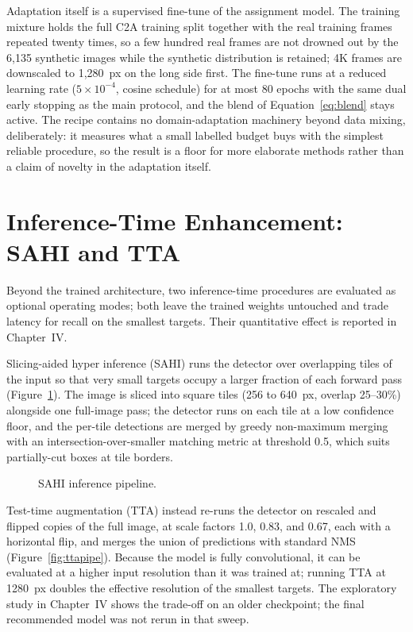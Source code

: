 Adaptation itself is a supervised fine-tune of the assignment model. The
training mixture holds the full C2A training split together with the real
training frames repeated twenty times, so a few hundred real frames are not
drowned out by the 6{,}135 synthetic images while the synthetic distribution
is retained; 4K frames are downscaled to 1{,}280~px on the long side first.
The fine-tune runs at a reduced learning rate ($5\times10^{-4}$, cosine
schedule) for at most 80 epochs with the same dual early stopping as the main
protocol, and the blend of Equation~\eqref{eq:blend} stays active. The recipe
contains no domain-adaptation machinery beyond data mixing, deliberately: it
measures what a small labelled budget buys with the simplest reliable
procedure, so the result is a floor for more elaborate methods rather than a
claim of novelty in the adaptation itself.

\section{Inference-Time Enhancement: SAHI and TTA}
Beyond the trained architecture, two inference-time procedures are evaluated as
optional operating modes; both leave the trained weights untouched and trade
latency for recall on the smallest targets. Their quantitative effect is
reported in Chapter~IV.

Slicing-aided hyper inference (SAHI) runs the detector over overlapping tiles of
the input so that very small targets occupy a larger fraction of each forward
pass (Figure~\ref{fig:sahipipe}). The image is sliced into square tiles (256 to
640~px, overlap 25--30\%) alongside one full-image pass; the detector runs on
each tile at a low confidence floor, and the per-tile detections are merged by
greedy non-maximum merging with an intersection-over-smaller matching metric at
threshold 0.5, which suits partially-cut boxes at tile borders.

\begin{figure}[tbp]
  \centering
  \caption{SAHI inference pipeline.}
  \label{fig:sahipipe}
\end{figure}

Test-time augmentation (TTA) instead re-runs the detector on rescaled and
flipped copies of the full image, at scale factors 1.0, 0.83, and 0.67, each
with a horizontal flip, and merges the union of predictions with standard NMS
(Figure~\ref{fig:ttapipe}). Because the model is fully convolutional, it can be
evaluated at a higher input resolution than it was trained at; running TTA at
1280~px doubles the effective resolution of the smallest targets. The
exploratory study in Chapter~IV shows the trade-off on an older checkpoint;
the final recommended model was not rerun in that sweep.

